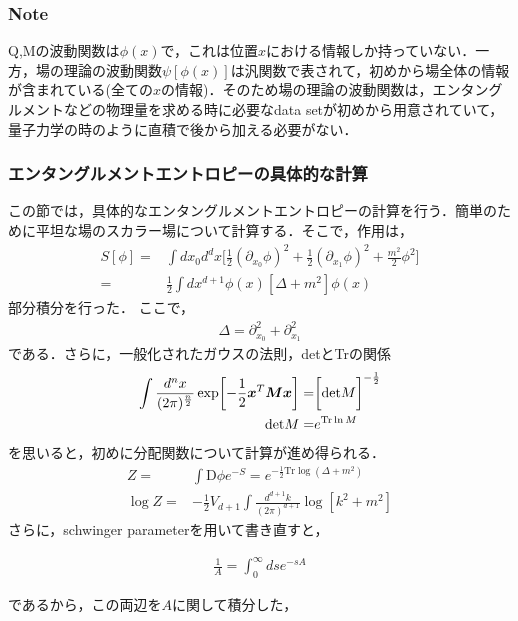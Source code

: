 \subsubsection{Note}
Q,Mの波動関数は$\phi(x)$で，これは位置$x$における情報しか持っていない．一方，場の理論の波動関数$\psi[\phi(x)]$は汎関数で表されて，初めから場全体の情報が含まれている(全ての$x$の情報)．そのため場の理論の波動関数は，エンタングルメントなどの物理量を求める時に必要なdata setが初めから用意されていて，量子力学の時のように直積で後から加える必要がない．

\subsubsection{エンタングルメントエントロピーの具体的な計算}
この節では，具体的なエンタングルメントエントロピーの計算を行う．簡単のために平坦な場のスカラー場について計算する．そこで，作用は，
\begin{align}
  S[\phi]=&\int dx_0d^dx\biggl[\frac{1}{2}(\partial_{x_0}\phi)^2+\frac{1}{2}(\partial_{x_1}\phi)^2+\frac{m^2}{2}\phi^2\biggr]\\
  =&\frac{1}{2}\int dx^{d+1}\phi(x)[\Delta+m^2]\phi(x)
\end{align}
部分積分を行った．
ここで，
\begin{align}
  \Delta=\partial_{x_0}^2+\partial_{x_1}^2
\end{align}
である．さらに，一般化されたガウスの法則，detとTrの関係
\begin{align}
  \int\frac{d^nx}{(2\pi)^{\frac{n}{2}}}\exp\biggl[-\frac{1}{2}\mbox{\boldmath$x$}^{T}\mbox{\boldmath$M$}\mbox{\boldmath$x$}\biggr]=&\biggl[\mathrm{det}M\biggr]^{-\frac{1}{2}} \\
  \mathrm{det}M=&e^{\mathrm{Tr}\ln M}
\end{align}
を思いると，初めに分配関数について計算が進め得られる．
\begin{align}
  \label{logZ}
  Z=&\int\mathrm{D}\phi e^{-S}=e^{-\frac{1}{2}\mathrm{Tr}\log(\Delta+m^2)} \\
  \log Z=&-\frac{1}{2}V_{d+1}\int\frac{d^{d+1}k}{(2\pi)^{d+1}}\log[k^2+m^2]
\end{align}
さらに，schwinger parameterを用いて書き直すと，
\begin{empheqboxed}

  \begin{align}
    \frac{1}{A}=\int^{\infty}_{0}ds e^{-sA}
  \end{align}

\end{empheqboxed}
であるから，この両辺を$A$に関して積分した，
